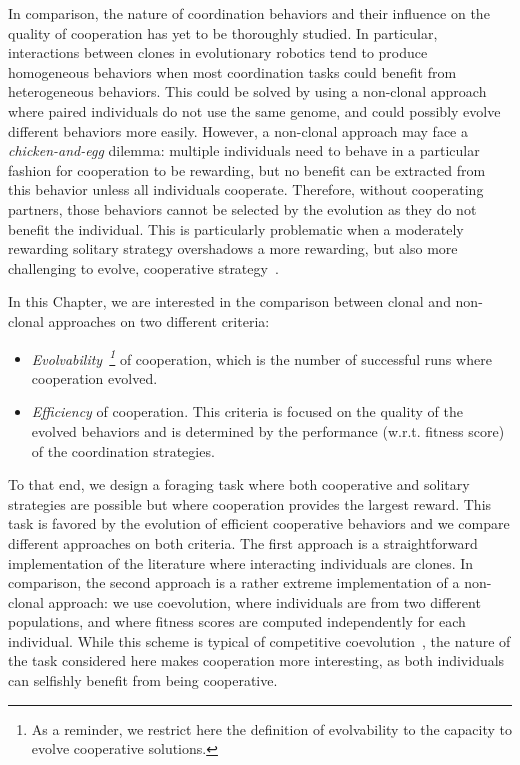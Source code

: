   In comparison, the nature of coordination behaviors and their influence on the quality of cooperation has yet to be thoroughly studied. In particular, interactions between clones in evolutionary robotics tend to produce homogeneous behaviors when most coordination tasks could benefit from heterogeneous behaviors. This could be solved by using a non-clonal approach where paired individuals do not use the same genome, and could possibly evolve different behaviors more easily. However, a non-clonal approach may face a \emph{chicken-and-egg} dilemma: multiple individuals need to behave in a particular fashion for cooperation to be rewarding, but no benefit can be extracted from this behavior unless all individuals cooperate. Therefore, without cooperating partners, those behaviors cannot be selected by the evolution as they do not benefit the individual. This is particularly problematic when a moderately rewarding solitary strategy overshadows a more rewarding, but also more challenging to evolve, cooperative strategy~\parencite{Skyrms2004}.

  In this Chapter, we are interested in the comparison between clonal and non-clonal approaches on two different criteria:
 \begin{itemize}
    \item{\emph{Evolvability~\footnote{As a reminder, we restrict here the definition of evolvability to the capacity to evolve cooperative solutions.}} of cooperation, which is the number of successful runs where cooperation evolved.}
    \item{\emph{Efficiency} of cooperation. This criteria is focused on the quality of the evolved behaviors and is determined by the performance (w.r.t. fitness score) of the coordination strategies.}
  \end{itemize}

  To that end, we design a foraging task where both cooperative and solitary strategies are possible but where cooperation provides the largest reward. This task is favored by the evolution of efficient cooperative behaviors and we compare different approaches on both criteria. The first approach is a straightforward implementation of the literature where interacting individuals are clones. In comparison, the second approach is a rather extreme implementation of a non-clonal approach: we use coevolution, where individuals are from two different populations, and where fitness scores are computed independently for each individual. While this scheme is typical of competitive coevolution~\parencite{Floreano1997, Floreano1998, Panait2005}, the nature of the task considered here makes cooperation more interesting, as both individuals can selfishly benefit from being cooperative.

